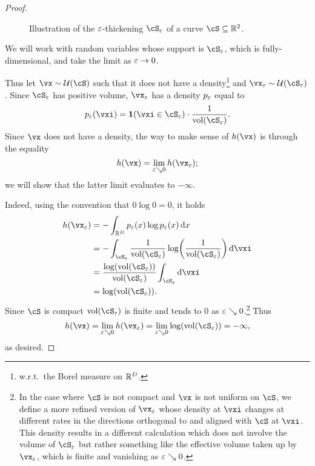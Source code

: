 \documentclass[../../book-main.tex]{subfiles}
\begin{document}
\begin{proof}
\begin{figure}[th]
\begin{tikzpicture}
        \end{tikzpicture}
        \caption{Illustration of the \(\eps\)-thickening \(\cS_\eps\) of a curve \(\cS \subseteq \R^{2}\).}
        \label{fig:entropy_eps_thickening}
    \end{figure}
    We will work with random variables whose support is \(\cS_{\eps}\), which is fully-dimensional, and take the limit as \(\eps \to 0\).

    Thus let \(\vx \sim \dUnif(\cS)\) such that it does not have a density\footnote{w.r.t.~the Borel measure on \(\R^{D}\).} and \(\vx_{\eps} \sim \dUnif(\cS_{\eps})\). Since \(\cS_{\eps}\) has positive volume, \(\vx_{\eps}\) has a density \(p_{\eps}\) equal to
    \begin{equation}
        p_{\eps}(\vxi) = \indvar(\vxi \in \cS_{\eps}) \cdot \frac{1}{\volume(\cS_{\eps})}.
    \end{equation}
    Since \(\vx\) does not have a density, the way to make sense of \(h(\vx)\) is through the equality 
    \begin{equation}
        h(\vx) = \lim_{\eps \searrow 0}h(\vx_{\eps});
    \end{equation}
    we will show that the latter limit evaluates to \(-\infty\).

    Indeed, using the convention that \(0 \log 0 = 0\), it holds
    \begin{align}
        h(\vx_{\eps}) 
        &= -\int_{\R^{D}}p_{\eps}(x)\log p_{\eps}(x)\odif{x} \\ 
        &= -\int_{\cS_{\eps}}\frac{1}{\volume(\cS_{\eps})} \log\rp{\frac{1}{\volume(\cS_{\eps})}}\odif{\vxi} \\ 
        &= \frac{\log(\volume(\cS_{\eps}))}{\volume(\cS_{\eps})}\int_{\cS_{\eps}}\odif{\vxi} \\ 
        &= \log(\volume(\cS_{\eps})).
    \end{align}
    Since \(\cS\) is compact \(\volume(\cS_{\eps})\) is finite and tends to \(0\) as \(\eps \searrow 0\).\footnote{In the case where \(\cS\) is not compact and \(\vx\) is not uniform on \(\cS\), we define a more refined version of \(\vx_{\eps}\) whose density at \(\vxi\) changes at different rates in the directions orthogonal to and aligned with \(\cS\) at \(\vxi\). This density results in a different calculation which does not involve the volume of \(\cS_{\eps}\) but rather something like the effective volume taken up by \(\vx_{\eps}\), which is finite and vanishing as \(\eps \searrow 0\).} Thus
    \begin{equation}
        h(\vx) = \lim_{\eps \searrow 0}h(\vx_{\eps}) = \lim_{\eps \searrow 0}\log(\volume(\cS_{\eps})) = -\infty,
    \end{equation}
    as desired.
\end{proof}
\end{document}
